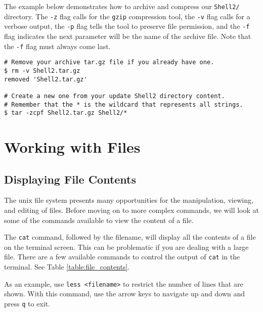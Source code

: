 The example below demonstrates how to archive and compress our \texttt{Shell2/} directory. The \texttt{-z} flag calls for the \texttt{gzip} compression tool, the \texttt{-v} flag calls for a verbose output, the \texttt{-p} flag tells the tool to preserve file permission, and the \texttt{-f} flag indicates the next parameter will be the name of the archive file. 
Note that the \texttt{-f} flag must always come last.

\begin{lstlisting}
# Remove your archive tar.gz file if you already have one.
$ rm -v Shell2.tar.gz
removed 'Shell2.tar.gz'

# Create a new one from your update Shell2 directory content.
# Remember that the * is the wildcard that represents all strings.
$ tar -zcpf Shell2.tar.gz Shell2/*  
\end{lstlisting}


\section*{Working with Files} %

\subsection*{Displaying File Contents}

The unix file system presents many opportunities for the manipulation, viewing, and editing of files.
Before moving on to more complex commands, we will look at some of the commands available to view the content of a file.

The \texttt{cat} command, followed by the filename, will display all the contents of a file on the terminal screen. 
This can be problematic if you are dealing with a large file. 
There are a few available commands to control the output of \texttt{cat} in the terminal. See Table \ref{table:file_contents}. 

As an example, use \texttt{less <filename>} to restrict the number of lines that are shown. 
With this command, use the arrow keys to navigate up and down and press \texttt{q} to exit.


